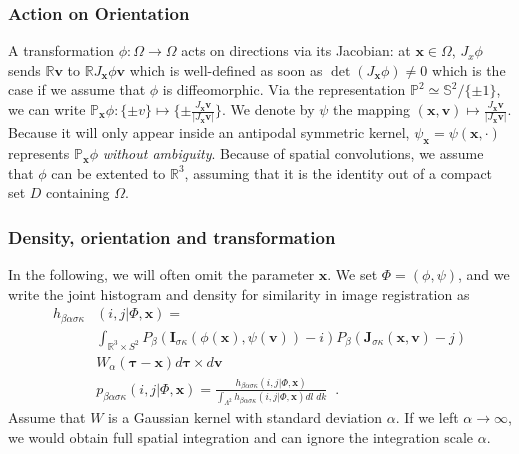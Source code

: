 \documentclass[twocolumn]{svjour3}
\begin{document}
\subsubsection{Action on Orientation}
A transformation $\phi:\Omega\to \Omega$ acts on directions via its Jacobian: at
${\bm x}\in \Omega$, $J_x\phi$ sends $\mathbb R\bm v$ to $\mathbb R J_{\bm x}\phi \bm v$
which is well-defined as soon as $\det(J_{\bm x}\phi)\not = 0$ which is the case if we
assume that $\phi$ is diffeomorphic. Via the representation
$\mathbb{P}^2\simeq \mathbb{S}^2/\{\pm1\}$, we can write
$\mathbb P_{\bm x}\phi:\{\pm v\} \mapsto \{\pm\frac{J_{\bm x}\bm v}{|J_{\bm x}\bm v|}\}$.
We denote by $\psi$ the mapping
$(\bm x,\bm v)\mapsto \frac{J_{\bm x}\bm v}{|J_{\bm x}\bm v|}$. Because it will only
appear inside an antipodal symmetric kernel, $\psi_{\bm x} = \psi(\bm x,\cdot)$ represents
$\mathbb P_{\bm x}\phi$ \emph{without ambiguity}. Because of spatial convolutions, we
assume that $\phi$ can be extented to $\mathbb R^3$, assuming that it is the identity out
of a compact set $D$ containing $\Omega$.

\subsubsection{Density, orientation and transformation}
In the following, we will often omit the parameter $\bm x$. We set $\Phi = (\phi,\psi)$,
and we write the joint histogram and density for similarity in image registration as
\begin{align}
  h_{\beta\alpha\sigma\kappa}&(i,j|\Phi,\bm x)=\\ 
                      &\int_{\mathbb R^3 \times S^2}P_\beta(\bm I_{\sigma\kappa}(\phi(\bm x),\psi(\bm v))-i)
                        P_\beta(\bm J_{\sigma\kappa}(\bm x,\bm v)-j)\nonumber \\
                      &W_\alpha(\bm \tau-\bm x)d\bm \tau\times d\bm v \nonumber \label{eq:densityreg} \\
                      &p_{\beta\alpha\sigma\kappa}(i,j|\Phi,\bm x)=\frac{h_{\beta\alpha\sigma\kappa}(i,j|\Phi,\bm x)}
                       {\int_{\Lambda^{2}} h_{\beta\alpha\sigma\kappa}(i,j| \Phi,\bm x)dl\;dk} \;\;.
\end{align}
Assume that $W$ is a Gaussian kernel with standard deviation $\alpha$. If we left
$\alpha\rightarrow\infty$, we would obtain full spatial integration and can ignore the
integration scale $\alpha$.
\end{document}
